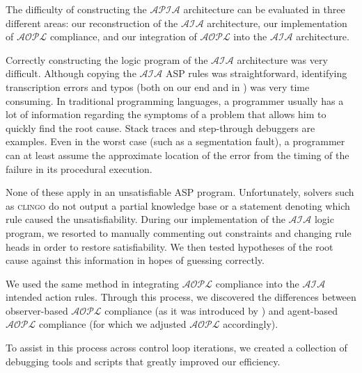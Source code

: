 The difficulty of constructing the $\mathcal{APIA}$ architecture can be evaluated in three different areas: our reconstruction of the $\mathcal{AIA}$ architecture, our implementation of $\mathcal{AOPL}$ compliance, and our integration of $\mathcal{AOPL}$ into the $\mathcal{AIA}$ architecture.

Correctly constructing the logic program of the $\mathcal{AIA}$ architecture was very difficult.
Although copying the $\mathcal{AIA}$ ASP rules was straightforward, identifying transcription errors and typos (both on our end and in \citet{blount_architecture_2013}) was very time consuming.
In traditional programming languages, a programmer usually has a lot of information regarding the symptoms of a problem that allows him to quickly find the root cause.
Stack traces and step-through debuggers are examples.
Even in the worst case (such as a segmentation fault), a programmer can at least assume the approximate location of the error from the timing of the failure in its procedural execution.

None of these apply in an unsatisfiable ASP program.
Unfortunately, solvers such as \textsc{clingo} do not output a partial knowledge base or a statement denoting which rule caused the unsatisfiability.
During our implementation of the $\mathcal{AIA}$ logic program, we resorted to manually commenting out constraints and changing rule heads in order to restore satisfiability.
We then tested hypotheses of the root cause against this information in hopes of guessing correctly.

We used the same method in integrating $\mathcal{AOPL}$ compliance into the $\mathcal{AIA}$ intended action rules.
Through this process, we discovered the differences between observer-based $\mathcal{AOPL}$ compliance (as it was introduced by \citet{gelfond_authorization_2008}) and agent-based $\mathcal{AOPL}$ compliance (for which we adjusted $\mathcal{AOPL}$ accordingly).

To assist in this process across control loop iterations, we created a collection of debugging tools and scripts that greatly improved our efficiency.
